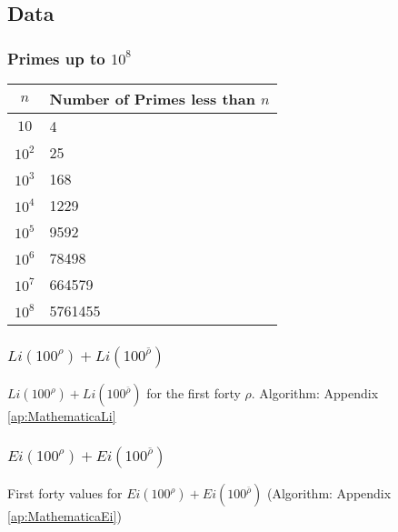 \subsection{Data} \label{Data}
\subsubsection{Primes up to $10^8$} \label{data:PrimesUpTo10^8}
\begin{table}[h]
	\begin{tabular}{c|l}
		$n$   & Number of Primes less than $n$ \\ \hline
		$10 $ & 4\\
		$10^{2} $ & 25\\
		$10^{3} $ & 168\\
		$10^{4} $ & 1229\\
		$10^{5} $ & 9592\\
		$10^{6} $ & 78498\\
		$10^{7} $ & 664579\\
		$10^{8} $ & 5761455\\
		
		
	\end{tabular}
\end{table}
\subsubsection{$Li(100^{\rho}) + Li(100^{\bar{\rho}})$}\label{tb:LiValuesFor100}
\begin{table} [h] \centering
	
	\caption{$Li(100^{\rho}) + Li(100^{\bar{\rho}})$ for the first forty $\rho$. Algorithm: Appendix \ref{ap:MathematicaLi}}
\end{table}


\vspace{5cm}
\subsubsection{$Ei(100^{\rho}) + Ei(100^{\bar{\rho}})$}\label{tb:EiValuesFor100}
\begin{table}[h] \centering
	\caption{First forty values for $Ei(100^{\rho}) + Ei(100^{\bar{\rho}})$ (Algorithm: Appendix \ref{ap:MathematicaEi})}
\end{table}

